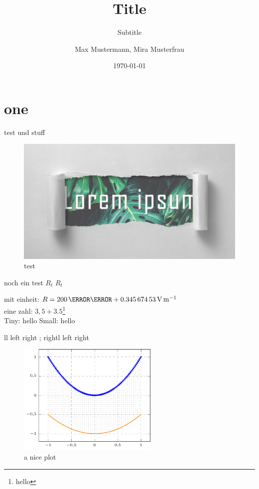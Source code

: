 \documentclass[twoside,f1]{HsH-report}
\author{
	Max Mustermann,
	Mira Musterfrau
}
\title{Title}
\subtitle{Subtitle}
\date{\today}
\begin{document}
\maketitle
\declarationAuthorship

\begin{abstract}
	\lipsum[5-8]
\end{abstract}

\tableofcontents

\cleardoublepage %

\chapter{one}
	\label{chap: one}
	{\color{red}test} und stuff
	\begin{figure}
		\centering
		\includegraphics[width=.6\textwidth]{img/lorem-ipsum.jpg}
		\caption{test}
	\end{figure}

	noch ein test \normalsubscripts$R_t$ \upsubscripts$R_t$

	mit einheit: $R=200\,\milli\ohm+ \SI{0.34567453}{\volt\per\metre}$
	\cite{laboranleitung:physik}
	\vspace{2cm}\\
	eine zahl: $3,5+3.5$\footnote[1]{hello}\\

	Tiny: {\tiny hello} Small: {\small hello}

	\makeatletter
	\newcommand{\test}[1][l]{
		{
			\def\t{#1}
			\if\t l left
			\else
				right
			\fi
		}
	}
	\test; \test[right]

	\lipsum[5-6]

	\pagebreak
	\begin{figure}
		\centering
		\includegraphics[width=0.6\textwidth, page=2]{plt/examplePlot.pdf}
		\caption{a nice plot}
	\end{figure}
\end{document}
